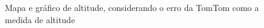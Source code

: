 \documentclass{article}
\begin{document}
\begin{figure}[h]
  \centering
  \caption{Mapa e gráfico de altitude, considerando o erro da TomTom como a medida de altitude}
  \label{fig:alt3}
\end{figure}
   
 



\end{document}
